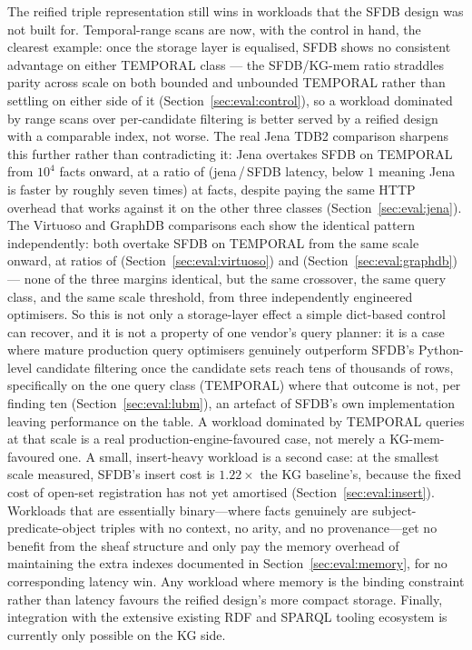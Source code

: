 The reified triple representation still wins in workloads that the SFDB
design was not built for. Temporal-range scans are now, with the control
in hand, the clearest example: once the storage layer is equalised,
SFDB shows no consistent advantage on either TEMPORAL class --- the
SFDB/KG-mem ratio straddles parity across scale on both bounded and
unbounded TEMPORAL rather than settling on either side of it
(Section~\ref{sec:eval:control}), so a workload dominated by range scans
over per-candidate filtering is better served by a reified design with a
comparable index, not worse. The real Jena TDB2 comparison sharpens this
further rather than contradicting it: Jena overtakes SFDB on
TEMPORAL from $10^4$ facts onward, at a ratio of
\temporaljenalarge{} (jena\,/\,SFDB latency,
below $1$ meaning Jena is faster by roughly seven times) at
\jenalargescale{} facts, despite paying the same HTTP overhead that works
against it on the other three classes (Section~\ref{sec:eval:jena}). The
Virtuoso and GraphDB comparisons each show the identical pattern
independently: both overtake SFDB on TEMPORAL from the same scale
onward, at ratios of \temporalvirtuosolarge{}
(Section~\ref{sec:eval:virtuoso}) and
\temporalgraphdblarge{}
(Section~\ref{sec:eval:graphdb}) --- none of
the three margins identical, but the same crossover, the same query
class, and the same scale threshold, from three independently
engineered optimisers. So this is not only a storage-layer effect a
simple dict-based control can recover, and it is not a property of one
vendor's query planner: it is a case where mature production query
optimisers genuinely outperform SFDB's Python-level candidate filtering
once the candidate sets reach tens of thousands of rows, specifically on
the one query class (TEMPORAL) where that outcome is not, per finding
ten (Section~\ref{sec:eval:lubm}), an artefact of SFDB's own
implementation leaving performance on the table. A workload
dominated by TEMPORAL queries at that scale is a real
production-engine-favoured case, not merely a KG-mem-favoured one. A
small, insert-heavy workload is a second
case: at the smallest scale measured, SFDB's insert cost is $1.22\times$
the KG baseline's, because the fixed cost of open-set registration has
not yet amortised (Section~\ref{sec:eval:insert}). Workloads that are essentially
binary---where facts genuinely are subject-predicate-object triples with
no context, no arity, and no provenance---get no benefit from the sheaf
structure and only pay the memory overhead of maintaining the extra
indexes documented in Section~\ref{sec:eval:memory}, for no corresponding
latency win. Any workload where memory is the binding constraint rather
than latency favours the reified design's more compact storage.
Finally, integration with the extensive existing RDF and SPARQL tooling
ecosystem is currently only possible on the KG side.


